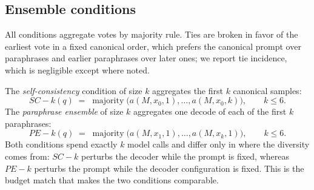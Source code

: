 \documentclass[preprint,12pt]{elsarticle}
\begin{document}
\subsection{Ensemble conditions}

All conditions aggregate votes by majority rule. Ties are broken in favor of the earliest vote in a fixed canonical order, which prefers the canonical prompt over paraphrases and earlier paraphrases over later ones; we report tie incidence, which is negligible except where noted.

The \emph{self-consistency} condition of size $k$ aggregates the first $k$ canonical samples:
\begin{equation}
SC-k(q) \;=\; \operatorname*{majority}\bigl( a(M, x_0, 1), \dots, a(M, x_0, k) \bigr), \qquad k \le 6 .
\end{equation}
The \emph{paraphrase ensemble} of size $k$ aggregates one decode of each of the first $k$ paraphrases:
\begin{equation}
PE-k(q) \;=\; \operatorname*{majority}\bigl( a(M, x_1, 1), \dots, a(M, x_k, 1) \bigr), \qquad k \le 6 .
\end{equation}
Both conditions spend exactly $k$ model calls and differ only in where the diversity comes from: $SC-k$ perturbs the decoder while the prompt is fixed, whereas $PE-k$ perturbs the prompt while the decoder configuration is fixed. This is the budget match that makes the two conditions comparable.
\end{document}
